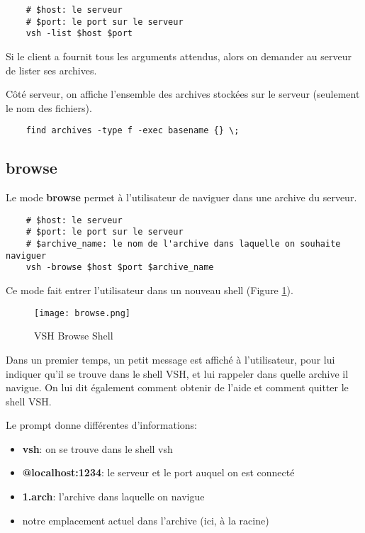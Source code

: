 \documentclass[titlepage]{article}
\begin{document}
	\begin{lstlisting}
	# $host: le serveur
	# $port: le port sur le serveur
	vsh -list $host $port
	\end{lstlisting}

	Si le client a fournit tous les arguments attendus, alors on demander au serveur de lister ses archives.

	Côté serveur, on affiche l'ensemble des archives stockées sur le serveur (seulement le nom des fichiers).

	\begin{lstlisting}
	find archives -type f -exec basename {} \;
	\end{lstlisting}

	\subsection{browse}

	Le mode \textbf{browse} permet à l'utilisateur de naviguer dans une archive du serveur.

	\begin{lstlisting}
	# $host: le serveur
	# $port: le port sur le serveur
	# $archive_name: le nom de l'archive dans laquelle on souhaite naviguer
	vsh -browse $host $port $archive_name
	\end{lstlisting}

	Ce mode fait entrer l'utilisateur dans un nouveau shell (Figure \ref{fig:browse}).

	\begin{figure}
  	\texttt{[image: browse.png]}
  	\caption{VSH Browse Shell}
  	\label{fig:browse}
	\end{figure}

	Dans un premier temps, un petit message est affiché à l'utilisateur, pour lui indiquer qu'il se trouve dans le shell VSH, et lui rappeler dans quelle archive il navigue. On lui dit également comment obtenir de l'aide et comment quitter le shell VSH.

	Le prompt donne différentes d'informations:
	\begin{itemize}  
		\item \textbf{vsh}: on se trouve dans le shell vsh
		\item \textbf{@localhost:1234}: le serveur et le port auquel on est connecté
		\item \textbf{{1.arch}}: l'archive dans laquelle on navigue
		\item notre emplacement actuel dans l'archive (ici, à la racine) 
	\end{itemize}
\end{document}
